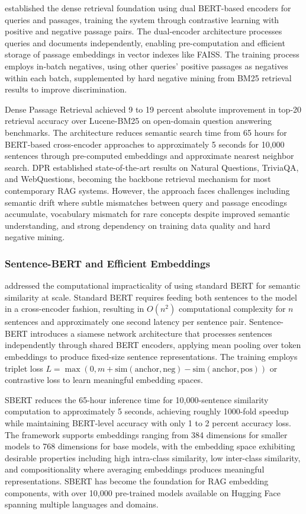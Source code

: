 \citet{karpukhin2020dense} established the dense retrieval foundation using dual BERT-based encoders for queries and passages, training the system through contrastive learning with positive and negative passage pairs. The dual-encoder architecture processes queries and documents independently, enabling pre-computation and efficient storage of passage embeddings in vector indexes like FAISS. The training process employs in-batch negatives, using other queries' positive passages as negatives within each batch, supplemented by hard negative mining from BM25 retrieval results to improve discrimination.

Dense Passage Retrieval achieved 9 to 19 percent absolute improvement in top-20 retrieval accuracy over Lucene-BM25 on open-domain question answering benchmarks. The architecture reduces semantic search time from 65 hours for BERT-based cross-encoder approaches to approximately 5 seconds for 10,000 sentences through pre-computed embeddings and approximate nearest neighbor search. DPR established state-of-the-art results on Natural Questions, TriviaQA, and WebQuestions, becoming the backbone retrieval mechanism for most contemporary RAG systems. However, the approach faces challenges including semantic drift where subtle mismatches between query and passage encodings accumulate, vocabulary mismatch for rare concepts despite improved semantic understanding, and strong dependency on training data quality and hard negative mining.

\subsubsection{Sentence-BERT and Efficient Embeddings}

\citet{reimers2019sentencebert} addressed the computational impracticality of using standard BERT for semantic similarity at scale. Standard BERT requires feeding both sentences to the model in a cross-encoder fashion, resulting in $O(n^2)$ computational complexity for $n$ sentences and approximately one second latency per sentence pair. Sentence-BERT introduces a siamese network architecture that processes sentences independently through shared BERT encoders, applying mean pooling over token embeddings to produce fixed-size sentence representations. The training employs triplet loss $L = \max(0, m + \text{sim}(\text{anchor}, \text{neg}) - \text{sim}(\text{anchor}, \text{pos}))$ or contrastive loss to learn meaningful embedding spaces.

SBERT reduces the 65-hour inference time for 10,000-sentence similarity computation to approximately 5 seconds, achieving roughly 1000-fold speedup while maintaining BERT-level accuracy with only 1 to 2 percent accuracy loss. The framework supports embeddings ranging from 384 dimensions for smaller models to 768 dimensions for base models, with the embedding space exhibiting desirable properties including high intra-class similarity, low inter-class similarity, and compositionality where averaging embeddings produces meaningful representations. SBERT has become the foundation for RAG embedding components, with over 10,000 pre-trained models available on Hugging Face spanning multiple languages and domains.

